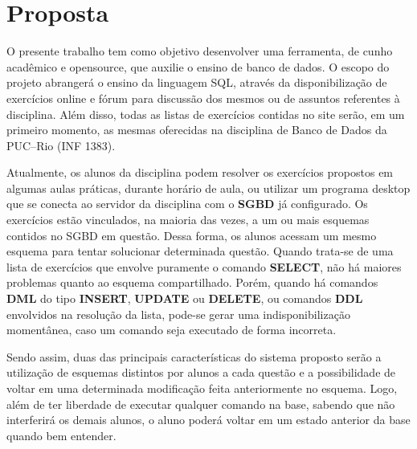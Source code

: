 \documentclass[graduacao,brazil]{ThesisPUC}
\begin{document}

\chapter{Proposta}

O presente trabalho tem como objetivo desenvolver uma ferramenta, de cunho acad\^{e}mico
e opensource, que auxilie o ensino de banco de dados. O escopo do projeto abranger\'{a} o ensino
da linguagem SQL, atrav\'{e}s da disponibiliza\c{c}\~{a}o de exerc\'{i}cios online e f\'{o}rum para discuss\~{a}o dos
mesmos ou de assuntos referentes \`{a} disciplina. Al\'{e}m disso, todas as listas de exerc\'{i}cios contidas
no site ser\~{a}o, em um primeiro momento, as mesmas oferecidas na disciplina de Banco de Dados
da PUC--Rio (INF 1383).

Atualmente, os alunos da disciplina podem resolver os exerc\'{i}cios propostos em algumas
aulas pr\'{a}ticas, durante hor\'{a}rio de aula, ou utilizar um programa desktop que se conecta ao
servidor da disciplina com o \textbf{SGBD} j\'{a} configurado. Os exerc\'{i}cios est\~{a}o vinculados, na maioria das
vezes, a um ou mais esquemas contidos no SGBD em quest\~{a}o. Dessa forma, os alunos acessam
um mesmo esquema para tentar solucionar determinada quest\~{a}o. Quando trata-se de uma lista de
exerc\'{i}cios que envolve puramente o comando \textbf{SELECT}, n\~{a}o h\'{a} maiores problemas quanto ao
esquema compartilhado. Por\'{e}m, quando h\'{a} comandos \textbf{DML} do tipo \textbf{INSERT}, \textbf{UPDATE} ou
\textbf{DELETE}, ou comandos \textbf{DDL} envolvidos na resolu\c{c}\~{a}o da lista, pode-se gerar uma
indisponibiliza\c{c}\~{a}o moment\^{a}nea, caso um comando seja executado de forma incorreta.

Sendo assim, duas das principais caracter\'{i}sticas do sistema proposto ser\~{a}o a utiliza\c{c}\~{a}o de
esquemas distintos por alunos a cada quest\~{a}o e a possibilidade de voltar em uma determinada
modifica\c{c}\~{a}o feita anteriormente no esquema. Logo, al\'{e}m de ter liberdade de executar qualquer
comando na base, sabendo que n\~{a}o interferir\'{a} os demais alunos, o aluno poder\'{a} voltar em um
estado anterior da base quando bem entender.

\end{document}

